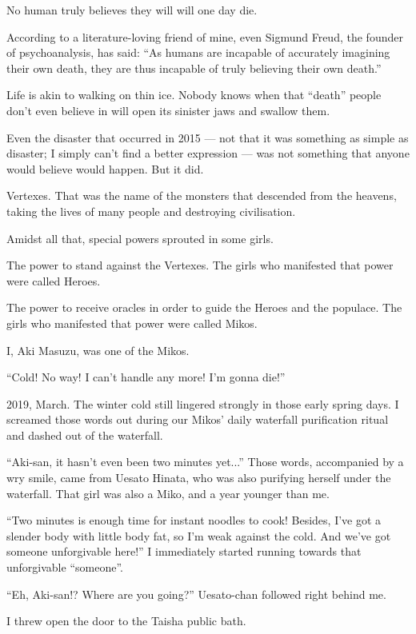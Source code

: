 

No human truly believes they will will one day die.

According to a literature-loving friend of mine, even Sigmund Freud, the founder of psychoanalysis, has said: ``As humans are incapable of accurately imagining their own death, they are thus incapable of truly believing their own death.''

Life is akin to walking on thin ice. Nobody knows when that ``death'' people don't even believe in will open its sinister jaws and swallow them.

Even the disaster that occurred in 2015 --- not that it was something as simple as disaster; I simply can't find a better expression --- was not something that anyone would believe would happen. But it did.

Vertexes. That was the name of the monsters that descended from the heavens, taking the lives of many people and destroying civilisation.

Amidst all that, special powers sprouted in some girls.

The power to stand against the Vertexes. The girls who manifested that power were called Heroes.

The power to receive oracles in order to guide the Heroes and the populace. The girls who manifested that power were called Mikos.

I, Aki Masuzu, was one of the Mikos.

``Cold! No way! I can't handle any more! I'm gonna die!''

2019, March. The winter cold still lingered strongly in those early spring days. I screamed those words out during our Mikos' daily waterfall purification ritual and dashed out of the waterfall.

``Aki-san, it hasn't even been two minutes yet...''  Those words, accompanied by a wry smile, came from Uesato Hinata, who was also purifying herself under the waterfall. That girl was also a Miko, and a year younger than me.

``Two minutes is enough time for instant noodles to cook! Besides, I've got a slender body with little body fat, so I'm weak against the cold. And we've got someone unforgivable here!''  I immediately started running towards that unforgivable ``someone''.

``Eh, Aki-san!? Where are you going?''  Uesato-chan followed right behind me.

I threw open the door to the Taisha public bath.

